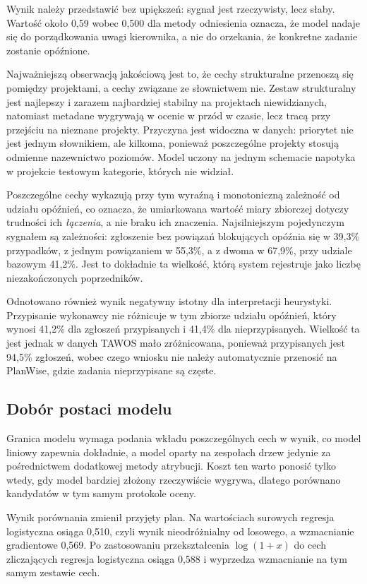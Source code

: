 Wynik należy przedstawić bez upiększeń: sygnał jest rzeczywisty, lecz słaby. Wartość około 0,59 wobec 0,500 dla metody odniesienia oznacza, że model nadaje się do porządkowania uwagi kierownika, a nie do orzekania, że konkretne zadanie zostanie opóźnione.

Najważniejszą obserwacją jakościową jest to, że cechy strukturalne przenoszą się pomiędzy projektami, a cechy związane ze słownictwem nie. Zestaw strukturalny jest najlepszy i zarazem najbardziej stabilny na projektach niewidzianych, natomiast metadane wygrywają w ocenie w przód w czasie, lecz tracą przy przejściu na nieznane projekty. Przyczyna jest widoczna w danych: priorytet nie jest jednym słownikiem, ale kilkoma, ponieważ poszczególne projekty stosują odmienne nazewnictwo poziomów. Model uczony na jednym schemacie napotyka w projekcie testowym kategorie, których nie widział.

Poszczególne cechy wykazują przy tym wyraźną i monotoniczną zależność od udziału opóźnień, co oznacza, że umiarkowana wartość miary zbiorczej dotyczy trudności ich \emph{łączenia}, a nie braku ich znaczenia. Najsilniejszym pojedynczym sygnałem są zależności: zgłoszenie bez powiązań blokujących opóźnia się w 39,3\% przypadków, z jednym powiązaniem w 55,3\%, a z dwoma w 67,9\%, przy udziale bazowym 41,2\%. Jest to dokładnie ta wielkość, którą system rejestruje jako liczbę niezakończonych poprzedników.

Odnotowano również wynik negatywny istotny dla interpretacji heurystyki. Przypisanie wykonawcy nie różnicuje w tym zbiorze udziału opóźnień, który wynosi 41,2\% dla zgłoszeń przypisanych i 41,4\% dla nieprzypisanych. Wielkość ta jest jednak w danych TAWOS mało zróżnicowana, ponieważ przypisanych jest 94,5\% zgłoszeń, wobec czego wniosku nie należy automatycznie przenosić na PlanWise, gdzie zadania nieprzypisane są częste.

\subsection{Dobór postaci modelu}

Granica modelu wymaga podania wkładu poszczególnych cech w wynik, co model liniowy zapewnia dokładnie, a model oparty na zespołach drzew jedynie za pośrednictwem dodatkowej metody atrybucji. Koszt ten warto ponosić tylko wtedy, gdy model bardziej złożony rzeczywiście wygrywa, dlatego porównano kandydatów w tym samym protokole oceny.

Wynik porównania zmienił przyjęty plan. Na wartościach surowych regresja logistyczna osiąga 0,510, czyli wynik nieodróżnialny od losowego, a wzmacnianie gradientowe 0,569. Po zastosowaniu przekształcenia \(\log(1+x)\) do cech zliczających regresja logistyczna osiąga 0,588 i wyprzedza wzmacnianie na tym samym zestawie cech.

